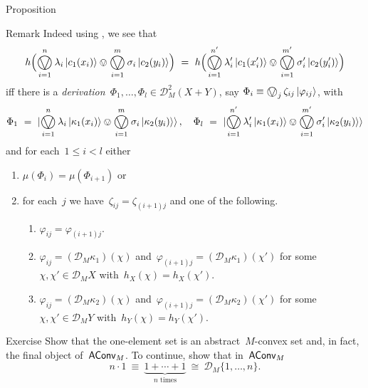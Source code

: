 \documentclass[b]{subfiles}
\begin{document}
\begin{parsec}
\begin{point}{Proposition}
\begin{point}{Remark}
Indeed
using , we see that
\begin{equation*}
     h 
     \Bigl( \bigovee^n_{i=1} \lambda_i \ket{c_1(x_i)}
     \ovee \bigovee^m_{i=1} \sigma_i \ket{c_2(y_i)} \Bigr) 
     \ = \ 
     h 
     \Bigl( \bigovee^{n'}_{i=1} \lambda'_i \ket{c_1(x'_i)}
     \ovee \bigovee^{m'}_{i=1} \sigma'_i \ket{c_2(y'_i)} \Bigr)
\end{equation*}
iff there is a \emph{derivation}~$\Phi_1, \ldots, \Phi_l \in \mathcal{D}^2_M(X+Y)$,
say $\Phi_i \equiv \bigovee_j \zeta_{ij} \ket{\varphi_{ij}}$,
with
\begin{equation*}
\Phi_1 \ =\  
\ket {\bigovee^n_{i=1} \lambda_i \ket{\kappa_1(x_i)}
\ovee \bigovee^m_{i=1} \sigma_i \ket{\kappa_2(y_i)}}
, \quad
 \Phi_l \ =\  
 \ket {\bigovee^{n'}_{i=1} \lambda'_i \ket{\kappa_1(x_i)}
 \ovee \bigovee^{m'}_{i=1} \sigma'_i \ket{\kappa_2(y_i)}}
\end{equation*}
and for each~$1 \leq i < l$ either
\begin{enumerate}
    \item $\mu(\Phi_i) = \mu(\Phi_{i+1})$
        or
    \item
        for each~$j$ we have~$\zeta_{ij} = \zeta_{(i+1)j}$
        and one of the following.
        \begin{enumerate}
        \item
    $\varphi_{ij} = \varphi_{(i+1)j}$.
\item
    $\varphi_{ij} = (\mathcal{D}_M\kappa_1) (\chi)$
and~$\varphi_{(i+1)j} = (\mathcal{D}_M\kappa_1) (\chi')$
        for some~$\chi,\chi' \in \mathcal{D}_M X$
        with~$h_X( \chi) = h_X(\chi')$.
\item
    $\varphi_{ij} = (\mathcal{D}_M\kappa_2) (\chi)$
and~$\varphi_{(i+1)j} = (\mathcal{D}_M\kappa_2) (\chi')$
        for some~$\chi,\chi' \in \mathcal{D}_M Y$
        with~$h_Y( \chi) = h_Y(\chi')$.
        \end{enumerate}
\end{enumerate}
\end{point}
\end{point}
\begin{point}{Exercise}%
Show that the one-element set is an abstract~$M$-convex set
    and, in fact, the final object of~$\mathsf{AConv}_M$.
To continue, show that in~$\mathsf{AConv}_M$
\begin{equation*}
    n \cdot 1 \ \equiv \ \underbrace{1 + \cdots + 1}_{\text{$n$ times}}
    \ \cong \ \mathcal{D}_M \{1, \ldots, n\}.
\end{equation*}
\end{point}
\end{parsec}
\end{document}
